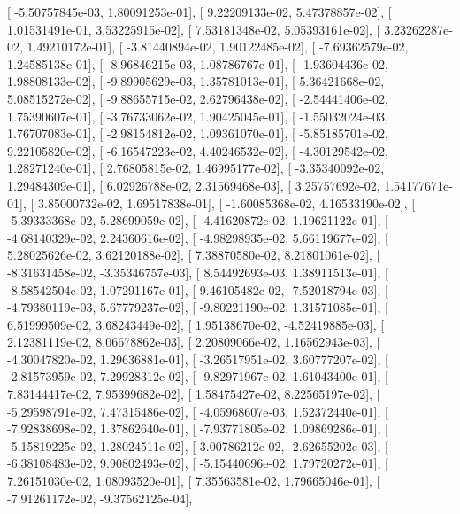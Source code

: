 \documentclass{article}
\begin{document}
       [ -5.50757845e-03,   1.80091253e-01],
       [  9.22209133e-02,   5.47378857e-02],
       [  1.01531491e-01,   3.53225915e-02],
       [  7.53181348e-02,   5.05393161e-02],
       [  3.23262287e-02,   1.49210172e-01],
       [ -3.81440894e-02,   1.90122485e-02],
       [ -7.69362579e-02,   1.24585138e-01],
       [ -8.96846215e-03,   1.08786767e-01],
       [ -1.93604436e-02,   1.98808133e-02],
       [ -9.89905629e-03,   1.35781013e-01],
       [  5.36421668e-02,   5.08515272e-02],
       [ -9.88655715e-02,   2.62796438e-02],
       [ -2.54441406e-02,   1.75390607e-01],
       [ -3.76733062e-02,   1.90425045e-01],
       [ -1.55032024e-03,   1.76707083e-01],
       [ -2.98154812e-02,   1.09361070e-01],
       [ -5.85185701e-02,   9.22105820e-02],
       [ -6.16547223e-02,   4.40246532e-02],
       [ -4.30129542e-02,   1.28271240e-01],
       [  2.76805815e-02,   1.46995177e-02],
       [ -3.35340092e-02,   1.29484309e-01],
       [  6.02926788e-02,   2.31569468e-03],
       [  3.25757692e-02,   1.54177671e-01],
       [  3.85000732e-02,   1.69517838e-01],
       [ -1.60085368e-02,   4.16533190e-02],
       [ -5.39333368e-02,   5.28699059e-02],
       [ -4.41620872e-02,   1.19621122e-01],
       [ -4.68140329e-02,   2.24360616e-02],
       [ -4.98298935e-02,   5.66119677e-02],
       [  5.28025626e-02,   3.62120188e-02],
       [  7.38870580e-02,   8.21801061e-02],
       [ -8.31631458e-02,  -3.35346757e-03],
       [  8.54492693e-03,   1.38911513e-01],
       [ -8.58542504e-02,   1.07291167e-01],
       [  9.46105482e-02,  -7.52018794e-03],
       [ -4.79380119e-03,   5.67779237e-02],
       [ -9.80221190e-02,   1.31571085e-01],
       [  6.51999509e-02,   3.68243449e-02],
       [  1.95138670e-02,  -4.52419885e-03],
       [  2.12381119e-02,   8.06678862e-03],
       [  2.20809066e-02,   1.16562943e-03],
       [ -4.30047820e-02,   1.29636881e-01],
       [ -3.26517951e-02,   3.60777207e-02],
       [ -2.81573959e-02,   7.29928312e-02],
       [ -9.82971967e-02,   1.61043400e-01],
       [  7.83144417e-02,   7.95399682e-02],
       [  1.58475427e-02,   8.22565197e-02],
       [ -5.29598791e-02,   7.47315486e-02],
       [ -4.05968607e-03,   1.52372440e-01],
       [ -7.92838698e-02,   1.37862640e-01],
       [ -7.93771805e-02,   1.09869286e-01],
       [ -5.15819225e-02,   1.28024511e-02],
       [  3.00786212e-02,  -2.62655202e-03],
       [ -6.38108483e-02,   9.90802493e-02],
       [ -5.15440696e-02,   1.79720272e-01],
       [  7.26151030e-02,   1.08093520e-01],
       [  7.35563581e-02,   1.79665046e-01],
       [ -7.91261172e-02,  -9.37562125e-04],
\end{document}
